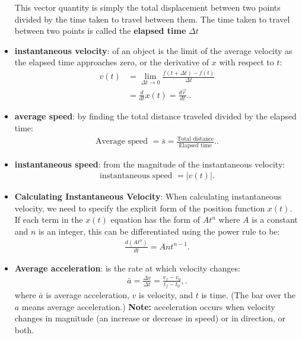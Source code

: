 \documentclass{report}
\begin{document}
\begin{itemize}
            This vector quantity is simply the total displacement between two points divided by the time taken to travel between them. The time taken to travel between two points is called the \textbf{elapsed time} $\Delta t$
        \item \textbf{instantaneous velocity}: of an object is the limit of the average velocity as the elapsed time approaches zero, or the derivative of $x$ with respect to $t$:
            \begin{align*}
                v(t) &= \lim\limits_{\Delta t \to 0}{\frac{f(t + \Delta t) - f(t)}{\Delta t}} \\
                 &= \frac{d}{dt}x(t) = \frac{d\vec{r}}{dt}.
            .\end{align*}
        \item \textbf{average speed}: by finding the total distance traveled divided by the elapsed time:
            \begin{align*}
                \text{Average speed } = \bar{s} = \frac{\text{Total distance}}{\text{Elapsed time}}.
            .\end{align*}
        \item \textbf{instantaneous speed}: from the magnitude of the instantaneous velocity:
            \begin{align*}
                \text{instantaneous speed } = \bigg\lvert v(t) \bigg\rvert
            .\end{align*}
        \item \textbf{Calculating Instantaneous Velocity}:
            When calculating instantaneous velocity, we need to specify the explicit form of the position function $x(t)$. If each term in the $x(t)$ equation has the form of $A t^n$ where $A$ is a constant and $n$ is an integer, this can be differentiated using the power rule to be:
            \begin{align*}
                \frac{d(At^{n})}{dt}= Ant^{n-1}
            .\end{align*}
        \item \textbf{Average acceleration}: is the rate at which velocity changes:
            \begin{align*}
                \bar{a} = \frac{\Delta v}{\Delta t} = \frac{v_f - v_0}{t_f - t_0},
            .\end{align*}
            where $\bar{a}$ is average acceleration, $v$ is velocity, and $t$ is time. (The bar over the $a$ means average acceleration.)
            \bigbreak \noindent 
            \textbf{Note:} acceleration occurs when velocity changes in magnitude (an increase or decrease in speed) or in direction, or both.

\end{itemize}
\end{document}
